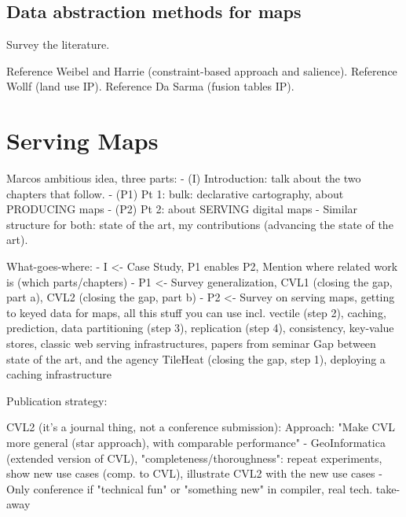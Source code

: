 \documentclass[11pt, oneside]{report}   	%
\begin{document}
\chapter{Data abstraction methods for maps}
Survey the literature.

Reference Weibel and Harrie (constraint-based approach and salience). Reference Wollf (land use IP). Reference Da Sarma (fusion tables IP).


\chapter{}


\part{Serving Maps}






Marcos ambitious idea, three parts:
- (I) Introduction: talk about the two chapters that follow. 
- (P1) Pt 1: bulk: declarative cartography, about PRODUCING maps
- (P2) Pt 2: about SERVING digital maps
- Similar structure for both: state of the art, my contributions (advancing the state of the art).  

What-goes-where:
- I <- Case Study, P1 enables P2, Mention where related work is (which parts/chapters)
- P1 <- 
        Survey generalization, 
        CVL1 (closing the gap, part a), 
        CVL2 (closing the gap, part b)
- P2 <- 
        Survey on serving maps, getting to keyed data for maps, all this stuff you can use 
                incl. vectile (step 2),
                caching,
                prediction,
                data partitioning (step 3), 
                replication (step 4), 
                consistency, 
                key-value stores, 
                classic web serving infrastructures,
                papers from seminar
        Gap between state of the art, and the agency
        TileHeat (closing the gap, step 1), deploying a caching infrastructure
        
Publication strategy:

CVL2 (it's a journal thing, not a conference submission):
Approach: "Make CVL more general (star approach), with comparable performance"
- GeoInformatica (extended version of CVL), "completeness/thoroughness": repeat experiments, show new use cases (comp. to CVL), illustrate CVL2 with the new use cases 
- Only conference if "technical fun" or "something new" in compiler, real tech. take-away
\end{document}
